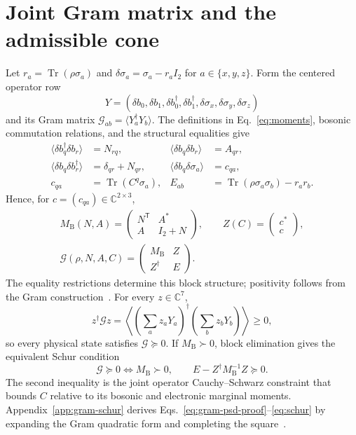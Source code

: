 \documentclass[10pt,twocolumn]{article}
\newcommand{\C}{\mathbb C}
\newcommand{\I}{I}
\newcommand{\Tr}{\operatorname{Tr}}
\newcommand{\MB}{M_{\mathrm B}}
\begin{document}
\section{Joint Gram matrix and the admissible cone}

Let $r_a=\Tr(\rho\sigma_a)$ and
$\delta\sigma_a=\sigma_a-r_a\I_2$ for $a\in\{x,y,z\}$.  Form the centered
operator row
\begin{equation}
Y=(\delta b_0,\delta b_1,\delta b_0^\dagger,\delta b_1^\dagger,
\delta\sigma_x,\delta\sigma_y,\delta\sigma_z)
\label{eq:operator-row}
\end{equation}
and its Gram matrix $\mathcal G_{ab}=\langle Y_a^\dagger Y_b\rangle$.
The definitions in Eq.~\eqref{eq:moments}, bosonic commutation relations, and
the structural equalities give
\begin{equation}
\begin{aligned}
\langle\delta b_q^\dagger\delta b_r\rangle&=N_{rq},&
\langle\delta b_q\delta b_r\rangle&=A_{qr},\\
\langle\delta b_q\delta b_r^\dagger\rangle&=\delta_{qr}+N_{qr},&
\langle\delta b_q\delta\sigma_a\rangle&=c_{qa},\\
c_{qa}&=\Tr(C^q\sigma_a),&
E_{ab}&=\Tr(\rho\sigma_a\sigma_b)-r_ar_b.
\end{aligned}
\label{eq:gram-entries}
\end{equation}
Hence, for $c=(c_{qa})\in\C^{2\times3}$,
\begin{equation}
\begin{gathered}
\MB(N,A)=\begin{pmatrix}N^{\mathsf T}&A^*\\A&\I_2+N\end{pmatrix},
\qquad Z(C)=\begin{pmatrix}c^*\\c\end{pmatrix},\\
\boxed{\mathcal G(\rho,N,A,C)=
\begin{pmatrix}\MB&Z\\Z^\dagger&E\end{pmatrix}.}
\end{gathered}
\label{eq:joint-gram}
\end{equation}
The equality restrictions determine this block structure; positivity follows
from the Gram construction~\cite{hornJohnson2012}.  For every $z\in\C^7$,
\begin{equation}
z^\dagger\mathcal Gz
=\left\langle\left(\sum_a z_aY_a\right)^\dagger
\left(\sum_bz_bY_b\right)\right\rangle\geq0,
\label{eq:gram-psd-proof}
\end{equation}
so every physical state satisfies $\mathcal G\succeq0$.  If $\MB\succ0$,
block elimination gives the equivalent Schur condition
\begin{equation}
\mathcal G\succeq0
\Longleftrightarrow
\MB\succ0,\qquad E-Z^\dagger\MB^{-1}Z\succeq0.
\label{eq:schur}
\end{equation}
The second inequality is the joint operator Cauchy--Schwarz constraint that
bounds $C$ relative to its bosonic and electronic marginal moments.
Appendix~\ref{app:gram-schur} derives
Eqs.~\eqref{eq:gram-psd-proof}--\eqref{eq:schur} by expanding the Gram
quadratic form and completing the square~\cite{zhang2005}.
\end{document}
